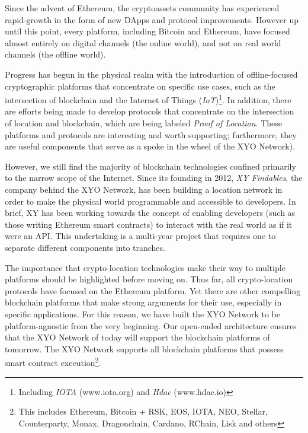 \documentclass{article}
\begin{document}
Since the advent of Ethereum, the cryptoassets community has experienced rapid-growth in the form of new DApps and protocol improvements. However up until this point, every platform, including Bitcoin and Ethereum, have focused almost entirely on digital channels (the online world), and not on real world channels (the offline world).

Progress has begun in the physical realm with the introduction of offline-focused cryptographic platforms that concentrate on specific use cases, such as the intersection of blockchain and the Internet of Things (\textit{IoT})\footnote{Including \textit{IOTA} (www.iota.org) and \textit{Hdac} (www.hdac.io)}. In addition, there are efforts being made to develop protocols that concentrate on the intersection of location and blockchain, which are being labeled \textit{Proof of Location}. These platforms and protocols are interesting and worth supporting; furthermore, they are useful components that serve as a spoke in the wheel of the XYO Network).

However, we still find the majority of blockchain technologies confined primarily to the narrow scope of the Internet. Since its founding in 2012, \textit{XY Findables}, the company behind the XYO Network, has been building a location network in order to make the physical world programmable and accessible to developers. In brief, XY has been working towards the concept of enabling developers (such as those writing Ethereum smart contracts) to interact with the real world as if it were an API. This undertaking is a multi-year project that requires one to separate different components into tranches.

The importance that crypto-location technologies make their way to multiple platforms should be highlighted before moving on. Thus far, all crypto-location protocols have focused on the Ethereum platform. Yet there are other compelling blockchain platforms that make strong arguments for their use, especially in specific applications. For this reason, we have built the XYO Network to be platform-agnostic from the very beginning. Our open-ended architecture ensures that the XYO Network of today will support the blockchain platforms of tomorrow. The XYO Network supports all blockchain platforms that possess smart contract execution\footnote{This includes Ethereum, Bitcoin + RSK, EOS, IOTA, NEO, Stellar, Counterparty, Monax, Dragonchain, Cardano, RChain, Lisk and others}.
\end{document}
